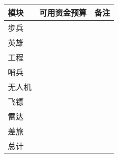 \begin{longtable}{ X | X | X }

    \hline

    \endfoot
    
    \rowcolor{tabhdcolor}
    
        模块 &
        可用资金预算 &
        备注 \\
    
    \hline
    
    \endhead
    
        步兵 &
        & 
        \\
    
    \hline
    
        英雄 &
        & 
        \\
    
    \hline
    
        工程 &
        & 
        \\
    
    \hline
    
        哨兵 &
        & 
        \\
    
    \hline
    
        无人机 &
        & 
        \\
    
    \hline
    
        飞镖 &
        & 
        \\
    
    \hline
    
        雷达 &
        & 
        \\

    \hline
    
        差旅 &
        & 
        \\
    
    \hline
    
        总计 &
        & 
        \\
    
    \hline
    
\end{longtable}
